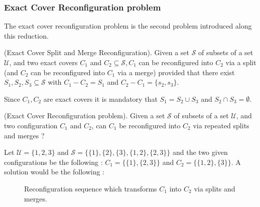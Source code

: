 \subsubsection{Exact Cover Reconfiguration problem} \label{subsubsection:Exact_cover}
The exact cover reconfiguration problem is the second problem introduced along this reduction.
\begin{defn}{(Exact Cover Split and Merge Reconfiguration).} Given a set $\mathcal{S}$ of subsets of a set $\mathcal{U}$, and two exact covers
$C_1$ and $C_2 \subseteq \mathcal{S}, C_1$ can be reconfigured into $C_2$ via a split (and $C_2$ can be reconfigured into $C_1$ via a merge)
provided that there exist $S_1, S_2, S_3 \subseteq \mathcal{S}$ with $C_1 - C_2 = S_1$ and $C_2 - C_1 = \{s_2, s_3\}$.

Since $C_1, C_2$ are exact covers it is mandatory that $S_1 = S_2 \cup S_3$ and $ S_2 \cap S_3 = \emptyset$.
\end{defn}

\begin{defn}{(Exact Cover Reconfiguration problem).} Given a set $\mathcal{S}$ of subsets of a set $\mathcal{U}$, and two configuration
$C_1$ and $C_2$, can $C_1$ be reconfigured into $C_2$ via repeated splits and merges ?
\end{defn}

\begin{example}
Let $\mathcal{U} = \{1,2,3\}$ and $\mathcal{S} = \{\{1\}, \{2\}, \{3\}, \{1,2\}, \{2,3\}\}$ and the two given configurations be the
following : $C_1 = \{\{1\}, \{2,3\}\}$ and $C_2 = \{\{1,2\}, \{3\}\}$. A solution would be the following :

\begin{figure}[h!]
\begin{center}
\begin{scaletikzpicturetowidth}{\textwidth}
\end{scaletikzpicturetowidth}
\end{center}
\caption{Reconfiguration sequence which transforms $C_1$ into $C_2$ via splits and merges.}\label{fig:exact_cover}
\end{figure}
\end{example}

